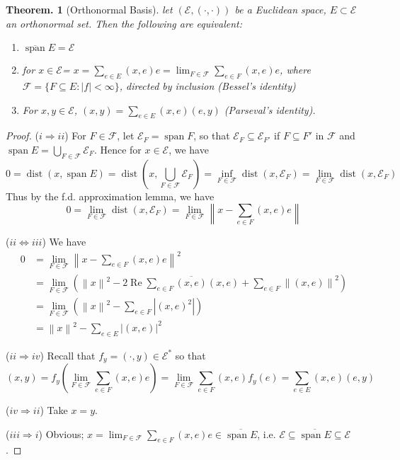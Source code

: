 \documentclass[11pt, a4paper]{memoir}
\newcommand{\imp}[2]{($#1\Rightarrow#2$)\hspace{0.2cm}}
\newcommand{\impe}[2]{($#1\Leftrightarrow#2$)\hspace{0.2cm}}
\newcommand{\norm}[1]{\ensuremath{\left\lVert#1\right\rVert}}
\theoremstyle{change}
\newtheorem{theorem}{Theorem.}[section]
\theoremstyle{plain}
\theoremstyle{nonumberplain}
\newtheorem{proof}{Proof}
\DeclareMathOperator{\spn}{span}
\renewcommand{\Re}{\ensuremath{\operatorname{Re}}}
\DeclareMathOperator{\dist}{dist}
\newcommand{\inr}[1]{\ensuremath{\left(#1\right)}}
\numberwithin{equation}{section}
\begin{document}
\begin{theorem}[Orthonormal Basis]
\item let $(\mathcal{E},\inr{\cdot,\cdot})$ be a Euclidean space, $E\subset\mathcal{E}$ an orthonormal set.
    Then the following are equivalent:
    \begin{enumerate}[nl,r]
        \item $\overline{\spn}E=\mathcal{E}$
        \item for $x\in\mathcal{E}$= $x=\sum_{e\in E}\inr{x,e}e=\lim_{F\in\mathcal{F}}\sum_{e\in F}\inr{x,e}e$, where $\mathcal{F}=\{F\subseteq E:|f|<\infty\}$, directed by inclusion (Bessel's identity)
        \item For $x,y\in\mathcal{E}$, $\inr{x,y}=\sum_{e\in E}\inr{x,e}\inr{e,y}$ (Parseval's identity).
    \end{enumerate}
\end{theorem}
\begin{proof}
    \imp{i}{ii}
    For $F\in\mathcal{F}$, let $\mathcal{E}_{F}=\spn F$, so that $\mathcal{E}_F\subseteq\mathcal{E}_{F'}$ if $F\subseteq F'$ in $\mathcal{F}$ and $\spn E=\bigcup_{F\in\mathcal{F}}\mathcal{E}_F$.
    Hence for $x\in\mathcal{E}$, we have
    \begin{equation*}
        0=\dist(x,\spn E)=\dist\left(x,\bigcup_{F\in\mathcal{F}}\mathcal{E}_F\right)=\inf_{F\in\mathcal{F}}\dist(x,\mathcal{E}_F)=\lim_{F\in\mathcal{F}}\dist(x,\mathcal{E}_F)
    \end{equation*}
    Thus by the f.d. approximation lemma, we have
    \begin{equation*}
        0 = \lim_{F\in\mathcal{F}}\dist(x,\mathcal{E}_F)=\lim_{F\in\mathcal{F}}\norm{x-\sum_{e\in F}\inr{x,e}e}
    \end{equation*}

    \impe{ii}{iii}
    We have
    \begin{align*}
        0&=\lim_{F\in\mathcal{F}}\norm{x-\sum_{e\in F}\inr{x,e}e}^2\\
         &=\lim_{F\in\mathcal{F}}\left(\norm{x}^2-2\Re\sum_{e\in F}\overline{\inr{x,e}}\inr{x,e}+\sum_{e\in F}\norm{\inr{x,e}}^2\right)\\
         &= \lim_{F\in\mathcal{F}}\left(\norm{x}^2-\sum_{e\in F}|\inr{x,e}^2|\right)\\
         &= \norm{x}^2-\sum_{e\in E}|\inr{x,e}|^2
    \end{align*}

    \imp{ii}{iv}
    Recall that $f_y=\inr{\cdot,y}\in\mathcal{E}^*$ so that
    \begin{equation*}
        \inr{x,y}=f_y\left(\lim_{F\in\mathcal{F}}\sum_{e\in F}\inr{x,e}e\right)=\lim_{F\in\mathcal{F}}\sum_{e\in F}\inr{x,e}f_y(e)=\sum_{e\in E}\inr{x,e}\inr{e,y}
    \end{equation*}
    
    \imp{iv}{ii}
    Take $x=y$.
    
    \imp{iii}{i}
    Obvious; $x=\lim_{F\in\mathcal{F}}\sum_{e\in F}\inr{x,e}e\in\overline{\spn E}$, i.e. $\mathcal{E}\subseteq\overline{\spn{E}}\subseteq\mathcal{E}$.
\end{proof}
\end{document}
